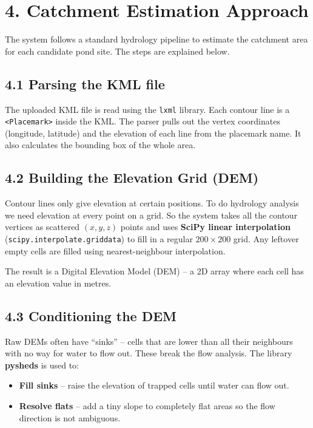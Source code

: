 \documentclass[12pt,a4paper]{article}
\begin{document}
\section*{4. Catchment Estimation Approach}

The system follows a standard hydrology pipeline to estimate the catchment
area for each candidate pond site. The steps are explained below.

\subsection*{4.1 Parsing the KML file}

The uploaded KML file is read using the \texttt{lxml} library. Each contour
line is a \texttt{<Placemark>} inside the KML. The parser pulls out the
vertex coordinates (longitude, latitude) and the elevation of each line from
the placemark name. It also calculates the bounding box of the whole area.

\subsection*{4.2 Building the Elevation Grid (DEM)}

Contour lines only give elevation at certain positions. To do hydrology
analysis we need elevation at every point on a grid. So the system takes all
the contour vertices as scattered $(x, y, z)$ points and uses
\textbf{SciPy linear interpolation} (\texttt{scipy.interpolate.griddata})
to fill in a regular $200 \times 200$ grid. Any leftover empty cells are
filled using nearest-neighbour interpolation.

The result is a Digital Elevation Model (DEM) -- a 2D array where each cell
has an elevation value in metres.

\subsection*{4.3 Conditioning the DEM}

Raw DEMs often have ``sinks'' -- cells that are lower than all their
neighbours with no way for water to flow out. These break the flow analysis.
The library \textbf{pysheds} is used to:

\begin{itemize}[leftmargin=2em]
  \item \textbf{Fill sinks} -- raise the elevation of trapped cells until
        water can flow out.
  \item \textbf{Resolve flats} -- add a tiny slope to completely flat areas
        so the flow direction is not ambiguous.
\end{itemize}
\end{document}
